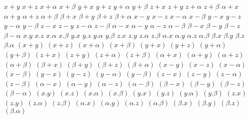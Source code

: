 $ x + y $
$ x + z $
$ x + \alpha $
$ x + \beta $
$ y + x $
$ y + z $
$ y + \alpha $
$ y + \beta $
$ z + x $
$ z + y $
$ z + \alpha $
$ z + \beta $
$ \alpha + x $
$ \alpha + y $
$ \alpha + z $
$ \alpha + \beta $
$ \beta + x $
$ \beta + y $
$ \beta + z $
$ \beta + \alpha $
$ x - y $
$ x - z $
$ x - \alpha $
$ x - \beta $
$ y - x $
$ y - z $
$ y - \alpha $
$ y - \beta $
$ z - x $
$ z - y $
$ z - \alpha $
$ z - \beta $
$ \alpha - x $
$ \alpha - y $
$ \alpha - z $
$ \alpha - \beta $
$ \beta - x $
$ \beta - y $
$ \beta - z $
$ \beta - \alpha $
$ x . y $
$ x . z $
$ x . \alpha $
$ x . \beta $
$ y . x $
$ y . z $
$ y . \alpha $
$ y . \beta $
$ z . x $
$ z . y $
$ z . \alpha $
$ z . \beta $
$ \alpha . x $
$ \alpha . y $
$ \alpha . z $
$ \alpha . \beta $
$ \beta . x $
$ \beta . y $
$ \beta . z $
$ \beta . \alpha $
$ (x + y) $
$ (x + z) $
$ (x + \alpha) $
$ (x + \beta) $
$ (y + x) $
$ (y + z) $
$ (y + \alpha) $
$ (y + \beta) $
$ (z + x) $
$ (z + y) $
$ (z + \alpha) $
$ (z + \beta) $
$ (\alpha + x) $
$ (\alpha + y) $
$ (\alpha + z) $
$ (\alpha + \beta) $
$ (\beta + x) $
$ (\beta + y) $
$ (\beta + z) $
$ (\beta + \alpha) $
$ (x - y) $
$ (x - z) $
$ (x - \alpha) $
$ (x - \beta) $
$ (y - x) $
$ (y - z) $
$ (y - \alpha) $
$ (y - \beta) $
$ (z - x) $
$ (z - y) $
$ (z - \alpha) $
$ (z - \beta) $
$ (\alpha - x) $
$ (\alpha - y) $
$ (\alpha - z) $
$ (\alpha - \beta) $
$ (\beta - x) $
$ (\beta - y) $
$ (\beta - z) $
$ (\beta - \alpha) $
$ (x . y) $
$ (x . z) $
$ (x . \alpha) $
$ (x . \beta) $
$ (y . x) $
$ (y . z) $
$ (y . \alpha) $
$ (y . \beta) $
$ (z . x) $
$ (z . y) $
$ (z . \alpha) $
$ (z . \beta) $
$ (\alpha . x) $
$ (\alpha . y) $
$ (\alpha . z) $
$ (\alpha . \beta) $
$ (\beta . x) $
$ (\beta . y) $
$ (\beta . z) $
$ (\beta . \alpha) $
